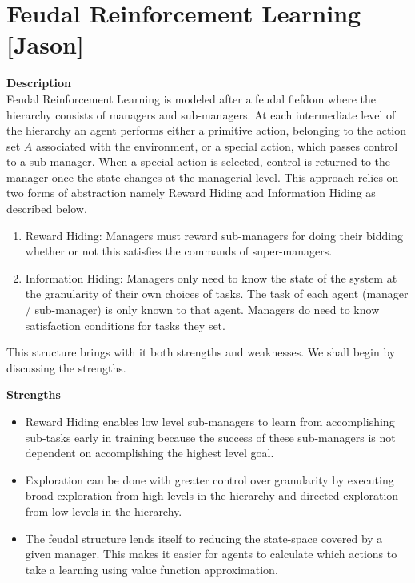 \section{Feudal Reinforcement Learning [Jason]}


\textbf{Description} \\
Feudal Reinforcement Learning is modeled after a feudal fiefdom where the hierarchy consists
of managers and sub-managers. At each intermediate level of the hierarchy an agent performs
either a primitive action, belonging to the action set $A$ associated with the environment, or
a special action, which passes control to a sub-manager. When a special action is selected, control is
returned to the manager once the state changes at the managerial level. This approach relies on two
forms of abstraction namely Reward Hiding and Information Hiding as described below.

\begin{enumerate}
    \item Reward Hiding: Managers must reward sub-managers for doing their bidding whether or not this
          satisfies the commands of super-managers.
    \item Information Hiding: Managers only need to know the state of the system at the granularity of
          their own choices of tasks. The task of each agent (manager / sub-manager) is only known to that
          agent. Managers do need to know satisfaction conditions for tasks they set.
\end{enumerate}

This structure brings with it both strengths and weaknesses. We shall begin by discussing the strengths.

\textbf{Strengths}
\begin{itemize}
    \item Reward Hiding enables low level sub-managers to learn from accomplishing sub-tasks early in training
          because the success of these sub-managers is not dependent on accomplishing the highest level goal.
    \item Exploration can be done with greater control over granularity by executing broad exploration from high levels
          in the hierarchy and directed exploration from low levels in the hierarchy.
    \item The feudal structure lends itself to reducing the state-space covered by a given manager.
          This makes it easier for agents to calculate which actions to take a learning using value function approximation.
\end{itemize}

